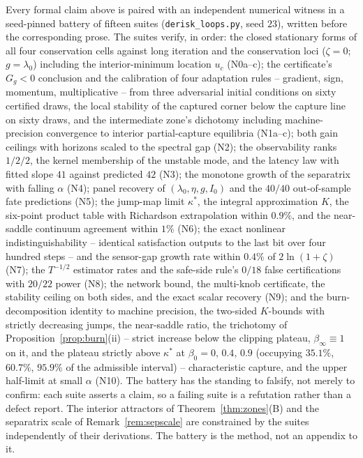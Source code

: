 \documentclass[11pt]{article}
\theoremstyle{definition}
\theoremstyle{remark}
\numberwithin{equation}{section}
\begin{document}
Every formal claim above is paired with an independent numerical witness in a seed-pinned battery of fifteen suites (\texttt{derisk\_loops.py}, seed $23$), written before the corresponding prose. The suites verify, in order: the closed stationary forms of all four conservation cells against long iteration and the conservation loci ($\zeta=0$; $g=\lambda_0$) including the interior-minimum location $u_c$ (N0a--c); the certificate's $G_g<0$ conclusion and the calibration of four adaptation rules -- gradient, sign, momentum, multiplicative -- from three adversarial initial conditions on sixty certified draws, the local stability of the captured corner below the capture line on sixty draws, and the intermediate zone's dichotomy including machine-precision convergence to interior partial-capture equilibria (N1a--c); both gain ceilings with horizons scaled to the spectral gap (N2); the observability ranks $1/2/2$, the kernel membership of the unstable mode, and the latency law with fitted slope $41$ against predicted $42$ (N3); the monotone growth of the separatrix with falling $\alpha$ (N4); panel recovery of $(\lambda_0,\eta,g,I_0)$ and the $40/40$ out-of-sample fate predictions (N5); the jump-map limit $\kappa^\ast$, the integral approximation $K$, the six-point product table with Richardson extrapolation within $0.9\%$, and the near-saddle continuum agreement within $1\%$ (N6); the exact nonlinear indistinguishability -- identical satisfaction outputs to the last bit over four hundred steps -- and the sensor-gap growth rate within $0.4\%$ of $2\ln(1+\zeta)$ (N7); the $T^{-1/2}$ estimator rates and the safe-side rule's $0/18$ false certifications with $20/22$ power (N8); the network bound, the multi-knob certificate, the stability ceiling on both sides, and the exact scalar recovery (N9); and the burn-decomposition identity to machine precision, the two-sided $K$-bounds with strictly decreasing jumps, the near-saddle ratio, the trichotomy of Proposition~\ref{prop:burn}(ii) -- strict increase below the clipping plateau, $\beta_\infty \equiv 1$ on it, and the plateau strictly above $\kappa^\ast$ at $\beta_0 = 0,\,0.4,\,0.9$ (occupying $35.1\%$, $60.7\%$, $95.9\%$ of the admissible interval) -- characteristic capture, and the upper half-limit at small $\alpha$ (N10). The battery has the standing to falsify, not merely to confirm: each suite asserts a claim, so a failing suite is a refutation rather than a defect report. The interior attractors of Theorem~\ref{thm:zones}(B) and the separatrix scale of Remark~\ref{rem:sepscale} are constrained by the suites independently of their derivations. The battery is the method, not an appendix to it.
\end{document}
